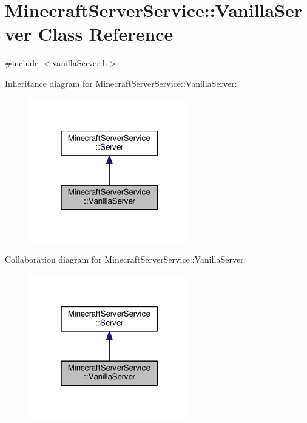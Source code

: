 \hypertarget{class_minecraft_server_service_1_1_vanilla_server}{}\section{Minecraft\+Server\+Service\+:\+:Vanilla\+Server Class Reference}
\label{class_minecraft_server_service_1_1_vanilla_server}


{\ttfamily \#include $<$vanilla\+Server.\+h$>$}



Inheritance diagram for Minecraft\+Server\+Service\+:\+:Vanilla\+Server\+:\nopagebreak
\begin{figure}[H]
\begin{center}
\leavevmode
\includegraphics[width=199pt]{class_minecraft_server_service_1_1_vanilla_server__inherit__graph}
\end{center}
\end{figure}


Collaboration diagram for Minecraft\+Server\+Service\+:\+:Vanilla\+Server\+:\nopagebreak
\begin{figure}[H]
\begin{center}
\leavevmode
\includegraphics[width=199pt]{class_minecraft_server_service_1_1_vanilla_server__coll__graph}
\end{center}
\end{figure}
